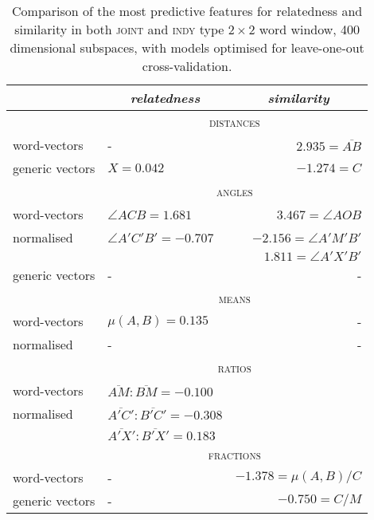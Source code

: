 \begin{table}
\centering
\begin{tabular}{llr}
\hline
& \multicolumn{1}{c}{\emph{relatedness}} & \multicolumn{1}{c}{\emph{similarity}} \\
\hline
& \multicolumn{2}{c}{\textsc{distances}} \\
word-vectors & - & $2.935 = \overline{AB}$ \\
generic vectors & $X = 0.042$ & $-1.274 = C$ \\
\hline
& \multicolumn{2}{c}{\textsc{angles}} \\
word-vectors & $\angle ACB = 1.681$ & $3.467 = \angle AOB$ \\
normalised & $\angle A'C'B' = -0.707$ & $-2.156 = \angle A'M'B'$ \\
& & $1.811 = \angle A'X'B'$ \\
generic vectors & - & - \\
\hline
& \multicolumn{2}{c}{\textsc{means}} \\
word-vectors & $\mu(A,B) = 0.135$ & - \\
normalised & - & - \\
\hline
& \multicolumn{2}{c}{\textsc{ratios}} \\
word-vectors & $\overline{AM}:\overline{BM} = -0.100$ \\
normalised & $\overline{A'C'}:\overline{B'C'} = -0.308$ \\
& $\overline{A'X'}:\overline{B'X'} = 0.183$ \\
\hline
& \multicolumn{2}{c}{\textsc{fractions}} \\
word-vectors & - & $-1.378 = \mu(A,B)/C$ \\
generic vectors & - & $-0.750 = C/M$ \\
\hline
\end{tabular}
\caption[Comparing Optimal Features for Relatedness and Similarity]{Comparison of the most predictive features for relatedness and similarity in both \textsc{joint} and \textsc{indy} type $2 \times 2$ word window, 400 dimensional subspaces, with models optimised for leave-one-out cross-validation.}
\label{tab:relsim-features}
\end{table}

